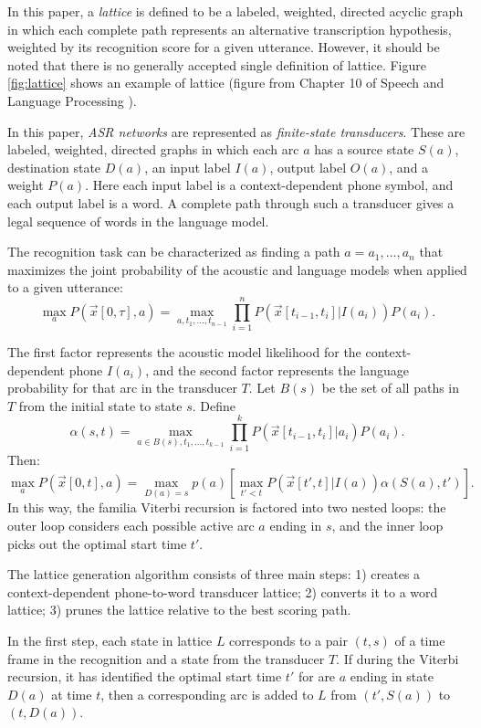 \documentclass[paper=a4, fontsize=18pt]{article} %
\numberwithin{equation}{section} %
\numberwithin{figure}{section} %
\numberwithin{table}{section} %
\begin{document}
In this paper, a \emph{lattice} is defined to be a labeled, weighted, directed acyclic graph in which each complete path represents an alternative transcription hypothesis, weighted by its recognition score for a given utterance. However, it should be noted that there is no generally accepted single definition of lattice. Figure \ref{fig:lattice} shows an example of lattice (figure from Chapter 10 of Speech and Language Processing \cite{Jurafsky2006}).

In this paper, \emph{ASR networks} are represented as \emph{finite-state transducers}. These are labeled, weighted, directed graphs in which each arc $a$ has a source state $S(a)$, destination state $D(a)$, an input label $I(a)$, output label $O(a)$, and a weight $P(a)$. Here each input label is a context-dependent phone symbol, and each output label is a word. A complete path through such a transducer gives a legal sequence of words in the language model.

The recognition task can be characterized as finding a path $a = a_1,...,a_n$ that maximizes the joint probability of the acoustic and language models when applied to a given utterance:
$$\max_a P(\vec{x}[0, \tau], a) = \max_{a, t_1, ..., t_{n-1}}\prod_{i=1}^n P(\vec{x}[t_{i-1}, t_i] | I(a_i)) P(a_i).$$

The first factor represents the acoustic model likelihood for the context-dependent phone $I(a_i)$, and the second factor represents the language probability for that arc in the transducer $T$. Let $B(s)$ be the set of all paths in $T$ from the initial state to state $s$. Define
$$\alpha(s,t) = \max_{a \in B(s), t_1, ..., t_{k-1}} \prod_{i=1}^k P(\vec{x}[t_{i-1}, t_i] | a_i) P(a_i).$$
Then:
$$\max_{a} P(\vec{x}[0,t], a) = \max_{D(a)=s} p(a) [\max_{t' < t} P(\vec{x}[t',t]|I(a)) \alpha(S(a), t')].$$
In this way, the familia Viterbi recursion is factored into two nested loops: the outer loop considers each possible active arc $a$ ending in $s$, and the inner loop picks out the optimal start time $t'$.

The lattice generation algorithm consists of three main steps: 1) creates a context-dependent phone-to-word transducer lattice; 2) converts it to a word lattice; 3) prunes the lattice relative to the best scoring path.

In the first step, each state in lattice $L$ corresponds to a pair $(t,s)$ of a time frame in the recognition and a state from the transducer $T$. If during the Viterbi recursion, it has identified the optimal start time $t'$ for are $a$ ending in state $D(a)$ at time $t$, then a corresponding arc is added to $L$ from $(t', S(a))$ to $(t, D(a))$.
\end{document}
